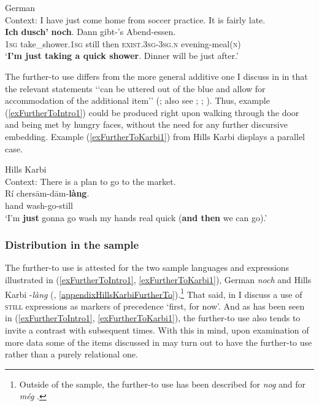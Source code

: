 {\begin{exe}
	\ex German\label{exFurtherToIntro1}\\
	Context: I have just come home from soccer practice. It is fairly late.\\
	\gll \textbf{Ich} \textbf{dusch'} \textbf{noch}. Dann gibt-'s Abend-essen.\\
	1\textsc{sg} take\_shower.1\textsc{sg} still then \textsc{exist}.3\textsc{sg}-3\textsc{sg}.\textsc{n} evening-meal(\textsc{n})\\
	\glt \lq \textbf{I'm just taking a quick shower}. Dinner will be just after.' \parencite[16]{Beck2019}
\end{exe}

The further-to use differs from the more general additive one I discuss in  in that the relevant statements \lq\lq can be uttered out of the blue and allow for accommodation of the additional item\rq\rq{ }(\cite[1846]{Umbach2012}; also see \cite{Klein2018}; \cite[101–102]{Nederstigt2003}; \cite{Vandeweghe1984}). Thus, example (\ref{exFurtherToIntro1}) could be produced right upon walking through the door and being met by hungry faces, without the need for any further discursive embedding. Example (\ref{exFurtherToKarbi1}) from Hills Karbi displays a parallel case.

\begin{exe}
	\ex Hills Karbi\\
	Context: There is a plan to go to the market.\label{exFurtherToKarbi1}\\
	\gll Rí chersām-dām-\textbf{làng}.\\
	hand wash-go-still\\
	\glt \lq I'm \textbf{just} gonna go wash my hands real quick (\textbf{and then} we can go).' \parencite[299–300]{Konnerth2014}
\end{exe}


\subsubsection{Distribution in the sample}
The further-to use is attested for the two sample languages and expressions illustrated in (\ref{exFurtherToIntro1}, \ref{exFurtherToKarbi1}), German \textit{noch} and Hills Karbi \mbox{-\textit{làng}} (, \ref{appendixHillsKarbiFurtherTo}).\footnote{Outside of the sample, the further-to use has been described for  \textit{nog} \parencite{Vandeweghe1984} and for  \textit{még} \parencite{CsirmazSlade2020}.} That said, in  I discuss a use of \textsc{still} expressions as markers of precedence \lq first, for now\rq{}. And as has been seen in (\ref{exFurtherToIntro1}, \ref{exFurtherToKarbi1}), the further-to use also tends to invite a contrast with subsequent times. With this in mind, upon examination of more data some of the items discussed in  may turn out to have the further-to use rather than a purely relational one.

}
